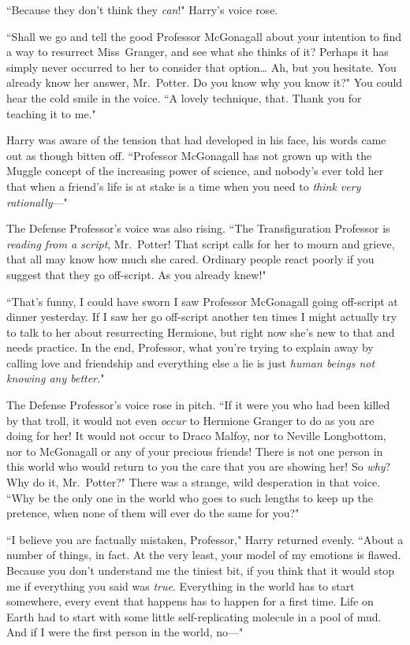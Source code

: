 ``Because they don't think they \emph{can}!" Harry's voice rose.

``Shall we go and tell the good Professor McGonagall about your intention to find a way to resurrect Miss~Granger, and see what she thinks of it? Perhaps it has simply never occurred to her to consider that option{\ldots} Ah, but you hesitate. You already know her answer, Mr.~Potter. Do you know why you know it?" You could hear the cold smile in the voice. ``A lovely technique, that. Thank you for teaching it to me."

Harry was aware of the tension that had developed in his face, his words came out as though bitten off. ``Professor McGonagall has not grown up with the Muggle concept of the increasing power of science, and nobody's ever told her that when a friend's life is at stake is a time when you need to \emph{think very rationally}---"

The Defense Professor's voice was also rising. ``The Transfiguration Professor is \emph{reading from a script}, Mr.~Potter! That script calls for her to mourn and grieve, that all may know how much she cared. Ordinary people react poorly if you suggest that they go off-script. As you already knew!"

``That's funny, I could have sworn I saw Professor McGonagall going off-script at dinner yesterday. If I saw her go off-script another ten times I might actually try to talk to her about resurrecting Hermione, but right now she's new to that and needs practice. In the end, Professor, what you're trying to explain away by calling love and friendship and everything else a lie is just \emph{human beings not knowing any better.}"

The Defense Professor's voice rose in pitch. ``If it were you who had been killed by that troll, it would not even \emph{occur} to Hermione Granger to do as you are doing for her! It would not occur to Draco Malfoy, nor to Neville Longbottom, nor to McGonagall or any of your precious friends! There is not one person in this world who would return to you the care that you are showing her! So \emph{why}? Why do it, Mr.~Potter?" There was a strange, wild desperation in that voice. ``Why be the only one in the world who goes to such lengths to keep up the pretence, when none of them will ever do the same for you?"

``I believe you are factually mistaken, Professor," Harry returned evenly. ``About a number of things, in fact. At the very least, your model of my emotions is flawed. Because you don't understand me the tiniest bit, if you think that it would stop me if everything you said was \emph{true}. Everything in the world has to start somewhere, every event that happens has to happen for a first time. Life on Earth had to start with some little self-replicating molecule in a pool of mud. And if I were the first person in the world, no---"

